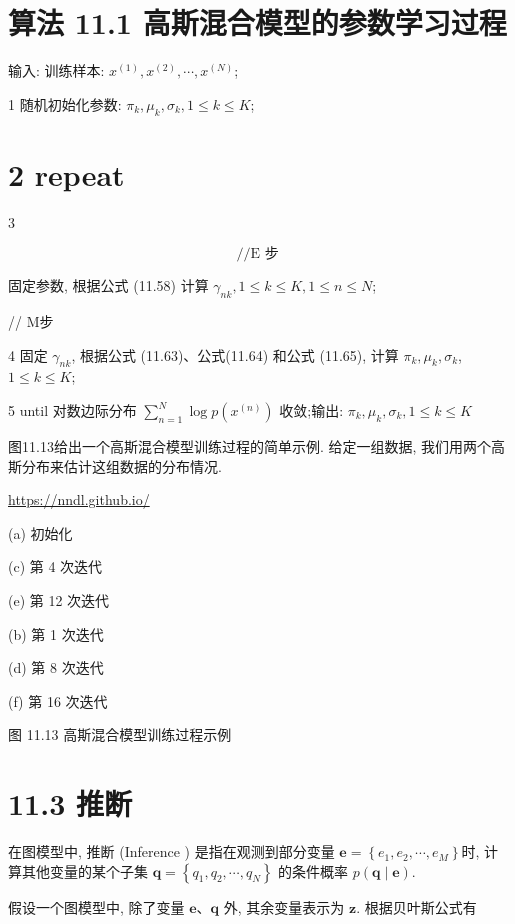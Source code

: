 \documentclass[10pt]{article}
\begin{document}
\section*{算法 11.1 高斯混合模型的参数学习过程}
输入: 训练样本: $x^{(1)}, x^{(2)}, \cdots, x^{(N)}$;

1 随机初始化参数: $\pi_{k}, \mu_{k}, \sigma_{k}, 1 \leq k \leq K$;

\section*{2 repeat}
3

$$
/ / \mathrm{E} \text { 步 }
$$

固定参数, 根据公式 (11.58) 计算 $\gamma_{n k}, 1 \leq k \leq K, 1 \leq n \leq N$;

// M步

4 固定 $\gamma_{n k}$, 根据公式 (11.63)、公式(11.64) 和公式 (11.65), 计算 $\pi_{k}, \mu_{k}, \sigma_{k}$, $1 \leq k \leq K$;

5 until 对数边际分布 $\sum_{n=1}^{N} \log p\left(x^{(n)}\right)$ 收敛;输出: $\pi_{k}, \mu_{k}, \sigma_{k}, 1 \leq k \leq K$

图11.13给出一个高斯混合模型训练过程的简单示例. 给定一组数据, 我们用两个高斯分布来估计这组数据的分布情况.

\href{https://nndl.github.io/}{https://nndl.github.io/}



(a) 初始化



(c) 第 4 次迭代



(e) 第 12 次迭代



(b) 第 1 次迭代



(d) 第 8 次迭代



(f) 第 16 次迭代

图 11.13 高斯混合模型训练过程示例

\section*{11.3 推断}
在图模型中, 推断 (Inference ) 是指在观测到部分变量 $\boldsymbol{e}=\left\{e_{1}, e_{2}, \cdots, e_{M}\right\}$时, 计算其他变量的某个子集 $\boldsymbol{q}=\left\{q_{1}, q_{2}, \cdots, q_{N}\right\}$ 的条件概率 $p(\boldsymbol{q} \mid \boldsymbol{e})$.

假设一个图模型中, 除了变量 $\boldsymbol{e} 、 \boldsymbol{q}$ 外, 其余变量表示为 $\boldsymbol{z}$. 根据贝叶斯公式有
\end{document}
